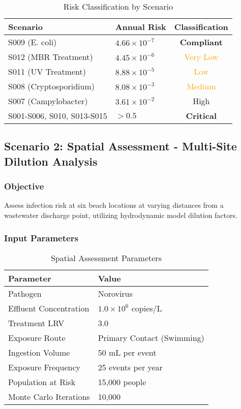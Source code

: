 \documentclass[11pt,a4paper]{article}
\begin{document}
\begin{table}[H]
\centering
\caption{Risk Classification by Scenario}
\begin{tabular}{llc}
\toprule
\textbf{Scenario} & \textbf{Annual Risk} & \textbf{Classification} \\
\midrule
S009 (E. coli) & $4.66 \times 10^{-7}$ & \textcolor{compliantgreen}{\textbf{Compliant}} \\
S012 (MBR Treatment) & $4.45 \times 10^{-6}$ & \textcolor{orange}{Very Low} \\
S011 (UV Treatment) & $8.88 \times 10^{-5}$ & \textcolor{orange}{Low} \\
S008 (Cryptosporidium) & $8.08 \times 10^{-3}$ & \textcolor{orange}{Medium} \\
S007 (Campylobacter) & $3.61 \times 10^{-2}$ & \textcolor{riskred}{High} \\
S001-S006, S010, S013-S015 & $> 0.5$ & \textcolor{riskred}{\textbf{Critical}} \\
\bottomrule
\end{tabular}
\end{table}

\subsection{Scenario 2: Spatial Assessment - Multi-Site Dilution Analysis}

\subsubsection{Objective}

Assess infection risk at six beach locations at varying distances from a wastewater discharge point, utilizing hydrodynamic model dilution factors.

\subsubsection{Input Parameters}

\begin{table}[H]
\centering
\caption{Spatial Assessment Parameters}
\begin{tabular}{ll}
\toprule
\textbf{Parameter} & \textbf{Value} \\
\midrule
Pathogen & Norovirus \\
Effluent Concentration & $1.0 \times 10^6$ copies/L \\
Treatment LRV & 3.0 \\
Exposure Route & Primary Contact (Swimming) \\
Ingestion Volume & 50 mL per event \\
Exposure Frequency & 25 events per year \\
Population at Risk & 15,000 people \\
Monte Carlo Iterations & 10,000 \\
\bottomrule
\end{tabular}
\end{table}
\end{document}

